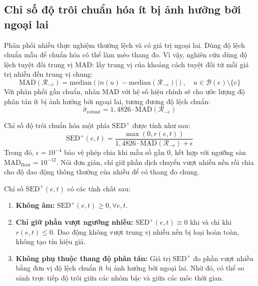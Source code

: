 \subsection{Chỉ số độ trôi chuẩn hóa ít bị ảnh hưởng bởi ngoại lai}
Phân phối nhiễu thực nghiệm thường lệch và có giá trị ngoại lai. Dùng độ lệch chuẩn mẫu để chuẩn hóa có thể làm méo thang đo. Vì vậy, nghiên cứu dùng độ lệch tuyệt đối trung vị MAD: lấy trung vị của khoảng cách tuyệt đối từ mỗi giá trị nhiễu đến trung vị chung:
\begin{equation}
\text{MAD}(\mathcal{R}_{-e}) = \text{median}\left( \left| n(u) - \text{median}(\mathcal{R}_{-e}) \right| \right), \quad u \in \mathcal{B}(e) \setminus \{e\}
\end{equation}
Với phân phối gần chuẩn, nhân MAD với hệ số hiệu chỉnh sẽ cho ước lượng độ phân tán ít bị ảnh hưởng bởi ngoại lai, tương đương độ lệch chuẩn:
\begin{equation}
\widehat{\sigma}_{\text{robust}} = 1{,}4826 \cdot \text{MAD}(\mathcal{R}_{-e})
\end{equation}

Chỉ số độ trôi chuẩn hóa một phía $\text{SED}^+$ được tính như sau:
\begin{equation}
\text{SED}^+(e, t) = \frac{\max\left(0, r(e, t)\right)}{1{,}4826 \cdot \text{MAD}\left(\mathcal{R}_{-e}\right) + \epsilon}
\label{eq:sed_plus}
\end{equation}
Trong đó, $\epsilon = 10^{-4}$ bảo vệ phép chia khi mẫu số gần 0, kết hợp với ngưỡng sàn $\text{MAD}_{\text{floor}} = 10^{-12}$.
Nói đơn giản, chỉ giữ phần dịch chuyển vượt nhiễu nền rồi chia cho độ dao động thông thường của nhiễu để có thang đo chung.

\begin{theorem}
Chỉ số $\text{SED}^+(e, t)$ có các tính chất sau:
\begin{enumerate}
    \item \textbf{Không âm:} $\text{SED}^+(e, t) \ge 0, \forall e, t$.
    \item \textbf{Chỉ giữ phần vượt ngưỡng nhiễu:} $\text{SED}^+(e, t) \equiv 0$ khi và chỉ khi $r(e, t) \le 0$. Dao động không vượt trung vị nhiễu nền bị loại hoàn toàn, không tạo tín hiệu giả.
    \item \textbf{Không phụ thuộc thang độ phân tán:} Giá trị $\text{SED}^+$ đo phần vượt nhiễu bằng đơn vị độ lệch chuẩn ít bị ảnh hưởng bởi ngoại lai. Nhờ đó, có thể so sánh trực tiếp độ trôi giữa các nhóm bậc và giữa các mốc thời gian.
\end{enumerate}
\end{theorem}

